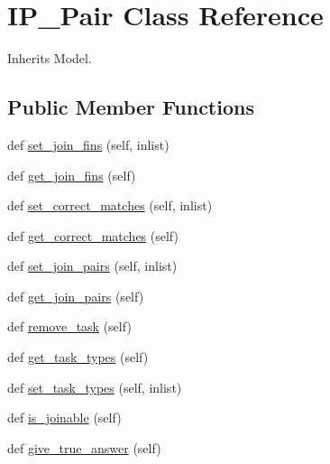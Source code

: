 \hypertarget{classdynamicfilterapp_1_1models_1_1_i_p___pair}{}\section{I\+P\+\_\+\+Pair Class Reference}
\label{classdynamicfilterapp_1_1models_1_1_i_p___pair}


Inherits Model.

\subsection*{Public Member Functions}
\begin{DoxyCompactItemize}
\item 
def \hyperlink{classdynamicfilterapp_1_1models_1_1_i_p___pair_a2469f89d3ff5860060ad5d6ee5bed6aa}{set\+\_\+join\+\_\+fins} (self, inlist)
\item 
def \hyperlink{classdynamicfilterapp_1_1models_1_1_i_p___pair_ad4a4fd5953d6391fe93c0313af62179f}{get\+\_\+join\+\_\+fins} (self)
\item 
def \hyperlink{classdynamicfilterapp_1_1models_1_1_i_p___pair_a1e690d6df7dc40428d200ce0494eb72a}{set\+\_\+correct\+\_\+matches} (self, inlist)
\item 
def \hyperlink{classdynamicfilterapp_1_1models_1_1_i_p___pair_ac0edbf94b370ed541539c84ecfede353}{get\+\_\+correct\+\_\+matches} (self)
\item 
def \hyperlink{classdynamicfilterapp_1_1models_1_1_i_p___pair_a7e9ff2535b53d8ece5a3f55f2abe05ed}{set\+\_\+join\+\_\+pairs} (self, inlist)
\item 
def \hyperlink{classdynamicfilterapp_1_1models_1_1_i_p___pair_a5a823d5be0be531512663d1c5a449e80}{get\+\_\+join\+\_\+pairs} (self)
\item 
def \hyperlink{classdynamicfilterapp_1_1models_1_1_i_p___pair_a88c991de34eb29936f716526d4b7f86d}{remove\+\_\+task} (self)
\item 
def \hyperlink{classdynamicfilterapp_1_1models_1_1_i_p___pair_ab5ba298be003142db12f57fa67c40a66}{get\+\_\+task\+\_\+types} (self)
\item 
def \hyperlink{classdynamicfilterapp_1_1models_1_1_i_p___pair_a53675dee30c576ef2c5dd654017626b1}{set\+\_\+task\+\_\+types} (self, inlist)
\item 
def \hyperlink{classdynamicfilterapp_1_1models_1_1_i_p___pair_a9dbf793309717a1d54169b53de55a88c}{is\+\_\+joinable} (self)
\item 
def \hyperlink{classdynamicfilterapp_1_1models_1_1_i_p___pair_a13fca2f105fb534c24f1cfb2abb2c85a}{give\+\_\+true\+\_\+answer} (self)

\end{DoxyCompactItemize}
